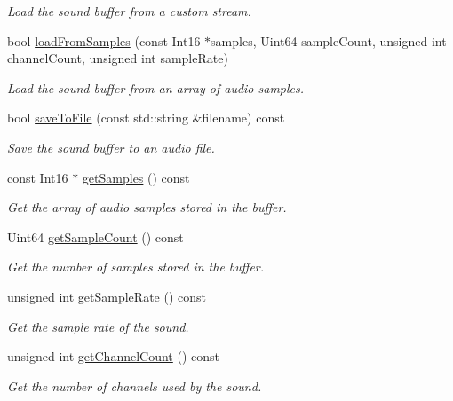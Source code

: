 \begin{DoxyCompactItemize}
\begin{DoxyCompactList}\small\item\em Load the sound buffer from a custom stream. \end{DoxyCompactList}\item 
bool \hyperlink{classsf_1_1_sound_buffer_a42d51ce4bb3b60c7ea06f63c273fd063}{load\+From\+Samples} (const Int16 $\ast$samples, Uint64 sample\+Count, unsigned int channel\+Count, unsigned int sample\+Rate)
\begin{DoxyCompactList}\small\item\em Load the sound buffer from an array of audio samples. \end{DoxyCompactList}\item 
bool \hyperlink{classsf_1_1_sound_buffer_aade64260c6375580a085314a30be007e}{save\+To\+File} (const std\+::string \&filename) const
\begin{DoxyCompactList}\small\item\em Save the sound buffer to an audio file. \end{DoxyCompactList}\item 
const Int16 $\ast$ \hyperlink{classsf_1_1_sound_buffer_ab9b2525a8da64cb266ba728aff7adecb}{get\+Samples} () const
\begin{DoxyCompactList}\small\item\em Get the array of audio samples stored in the buffer. \end{DoxyCompactList}\item 
Uint64 \hyperlink{classsf_1_1_sound_buffer_aebe2a4bdbfbd9249353748da3f6a4fa1}{get\+Sample\+Count} () const
\begin{DoxyCompactList}\small\item\em Get the number of samples stored in the buffer. \end{DoxyCompactList}\item 
unsigned int \hyperlink{classsf_1_1_sound_buffer_a2c2cf0078ce0549246ecc4a1646212b4}{get\+Sample\+Rate} () const
\begin{DoxyCompactList}\small\item\em Get the sample rate of the sound. \end{DoxyCompactList}\item 
unsigned int \hyperlink{classsf_1_1_sound_buffer_a127707b831d875ed790eef1aa2b9fcc3}{get\+Channel\+Count} () const
\begin{DoxyCompactList}\small\item\em Get the number of channels used by the sound. \end{DoxyCompactList}\item 

\end{DoxyCompactItemize}
